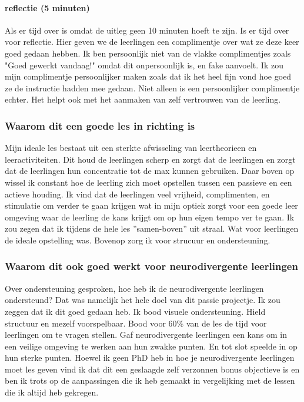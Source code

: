 \documentclass{article}
\begin{document}
                \paragraph{reflectie (5 minuten)}
                    Als er tijd over is omdat de uitleg geen 10 minuten hoeft te zijn. Is er tijd over voor reflectie. Hier geven we de leerlingen een complimentje over wat ze deze keer goed gedaan hebben. Ik ben persoonlijk niet van de vlakke complimentjes zoals "Goed gewerkt vandaag!" omdat dit onpersoonlijk is, en fake aanvoelt. Ik zou mijn complimentje persoonlijker maken zoals dat ik het heel fijn vond hoe goed ze de instructie hadden mee gedaan. Niet alleen is een persoonlijker complimentje echter. Het helpt ook met het aanmaken van zelf vertrouwen van de leerling.\cite{compliments-how-to}
            \subsubsection{Waarom dit een goede les in richting is}
                Mijn ideale les bestaat uit een sterkte afwisseling van leertheorieen en leeractiviteiten. Dit houd de leerlingen scherp en zorgt dat de leerlingen en zorgt dat de leerlingen hun concentratie tot de max kunnen gebruiken. Daar boven op wissel ik constant hoe de leerling zich moet opstellen tussen een passieve en een actieve houding. Ik vind dat de leerlingen veel vrijheid, complimenten, en stimulatie om verder te gaan krijgen wat in mijn optiek zorgt voor een goede leer omgeving waar de leerling de kans krijgt om op hun eigen tempo ver te gaan. Ik zou zegen dat ik tijdens de hele les ”samen-boven” uit straal. Wat voor leerlingen de ideale opstelling was.\cite{samen-boven-leads-to-better-results} Bovenop zorg ik voor strucuur en ondersteuning.
            \subsubsection{Waarom dit ook goed werkt voor neurodivergente leerlingen}
                Over ondersteuning gesproken, hoe heb ik de neurodivergente leerlingen ondersteund? Dat was namelijk het hele doel van dit passie projectje. Ik zou zeggen dat ik dit goed gedaan heb. Ik bood visuele ondersteuning. Hield structuur en mezelf voorspelbaar. Bood voor 60\% van de les de tijd voor leerlingen om te vragen stellen. Gaf neurodivergente leerlingen een kans om in een veilige omgeving te werken aan hun zwakke punten. En tot slot speelde in op hun sterke punten. Hoewel ik geen PhD heb in hoe je neurodivergente leerlingen moet les geven vind ik dat dit een geslaagde zelf verzonnen bonus objectieve is en ben ik trots op de aanpassingen die ik heb gemaakt in vergelijking met de lessen die ik altijd heb gekregen.
\end{document}

